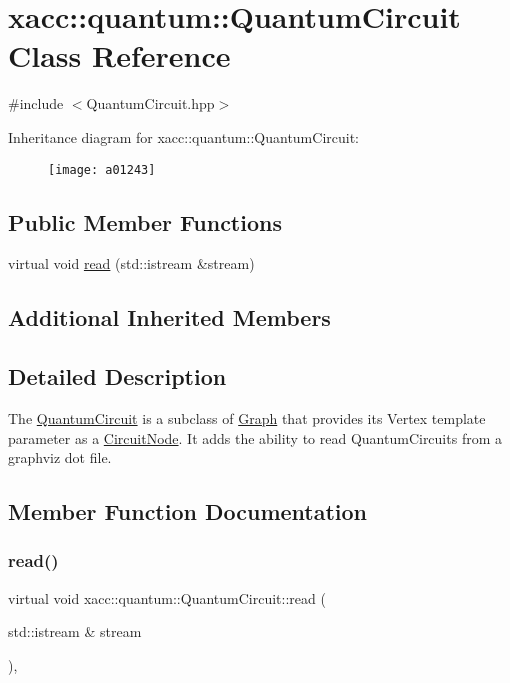 \hypertarget{a01243}{}\section{xacc\+:\+:quantum\+:\+:Quantum\+Circuit Class Reference}
\label{a01243}


{\ttfamily \#include $<$Quantum\+Circuit.\+hpp$>$}

Inheritance diagram for xacc\+:\+:quantum\+:\+:Quantum\+Circuit\+:\begin{figure}[H]
\begin{center}
\leavevmode
\texttt{[image: a01243]}
\end{center}
\end{figure}
\subsection*{Public Member Functions}
\begin{DoxyCompactItemize}
\item 
virtual void \hyperlink{a01243_af7a7f4a487d493fe8a4ed1f76cefd731}{read} (std\+::istream \&stream)
\end{DoxyCompactItemize}
\subsection*{Additional Inherited Members}


\subsection{Detailed Description}
The \hyperlink{a01243}{Quantum\+Circuit} is a subclass of \hyperlink{a01535}{Graph} that provides its Vertex template parameter as a \hyperlink{a01167}{Circuit\+Node}. It adds the ability to read Quantum\+Circuits from a graphviz dot file. 

\subsection{Member Function Documentation}
\mbox{\label{a01243_af7a7f4a487d493fe8a4ed1f76cefd731}} 
\subsubsection{\texorpdfstring{read()}{read()}}
{\footnotesize\ttfamily virtual void xacc\+::quantum\+::\+Quantum\+Circuit\+::read (\begin{DoxyParamCaption}\item[{std\+::istream \&}]{stream }\end{DoxyParamCaption})\hspace{0.3cm}{\ttfamily [inline]}, {\ttfamily [virtual]}}

